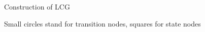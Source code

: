 \documentclass[8pt]{beamer}
\begin{document}


\begin{frame}{Construction of LCG}
\begin{figure}

\end{figure}

\begin{figure}



\end{figure}
Small circles stand for transition nodes, squares for state nodes

\end{frame}
\end{document}
